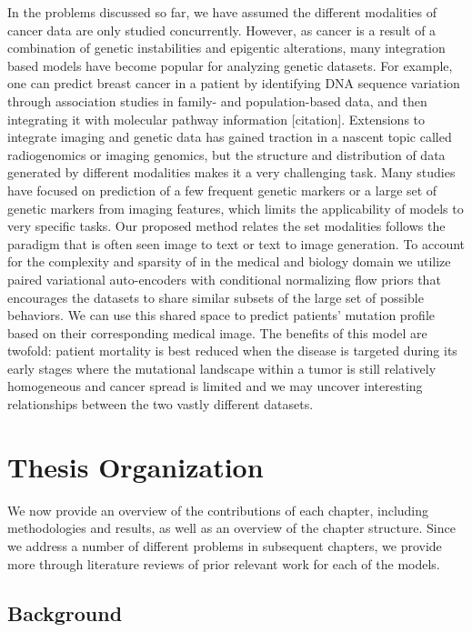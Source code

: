 In the problems discussed so far, we have assumed the different modalities of cancer data are only studied concurrently.  However, as cancer is a result of a combination of genetic instabilities and epigentic alterations, many integration based models have become popular for analyzing genetic datasets.  For example, one can predict breast cancer in a patient by identifying DNA sequence variation through association studies in family- and population-based data, and then integrating it with molecular pathway information [citation].  Extensions to integrate imaging and genetic data has gained traction in a nascent topic called radiogenomics or imaging genomics, but the structure and distribution of data generated by different modalities makes it a very challenging task. Many studies have focused on prediction of a few frequent genetic markers or a large set of genetic markers from imaging features, which limits the applicability of models to very specific tasks. Our proposed method relates the set modalities follows the paradigm that is often seen image to text or text to image generation.  To account for the complexity and sparsity of in the medical and biology domain we utilize paired variational auto-encoders with conditional normalizing flow priors that encourages the datasets to share similar subsets of the large set of possible behaviors.  We can use this shared space to predict patients' mutation profile based on their corresponding medical image.  The benefits of this model are twofold: patient mortality is best reduced when the disease is targeted during its early stages where the mutational landscape within a tumor is still relatively homogeneous and cancer spread is limited and we may uncover interesting relationships between the two vastly different datasets.

\section{Thesis Organization}

We now provide an overview of the contributions of each chapter, including methodologies and results, as well as an overview of the chapter structure.  Since we address a number of different problems in subsequent chapters, we provide more through literature reviews of prior relevant work for each of the models.

\subsection{Background}

